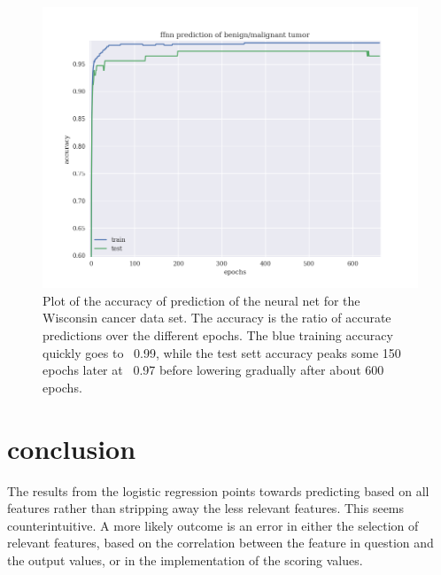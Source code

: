 \documentclass[10pt]{article}
\begin{document}
\begin{figure}[hbtp]
\includegraphics[scale=.6]{../ffnnaccuracy.png}
\caption{Plot of the accuracy of prediction of the neural net for the Wisconsin
	cancer data set.  The accuracy is the ratio of accurate predictions over
	the different epochs. The blue training accuracy quickly goes to ~0.99,
	while the test sett accuracy peaks some 150 epochs later at ~0.97 before
	lowering gradually after about 600 epochs.}
\label{fig:ffnnaccuracy}
\end{figure}


\section{conclusion}

The results from the logistic regression points towards predicting based on all features rather than 
stripping away the less relevant features. This seems counterintuitive. A more likely outcome is an 
error in either the selection of relevant features, based on the correlation between the feature in 
question and the output values, or in the implementation of the scoring values. 

\blindtext



%
\end{document}
